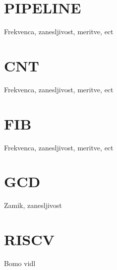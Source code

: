 \section{PIPELINE} \label{a}
Frekvenca, zanesljivost, meritve, ect

\section{CNT} \label{a}
Frekvenca, zanesljivost, meritve, ect

\section{FIB} \label{a}
Frekvenca, zanesljivost, meritve, ect

\section{GCD} \label{a}
Zamik, zanesljivost


\section{RISCV} \label{a}
Bomo vidl
